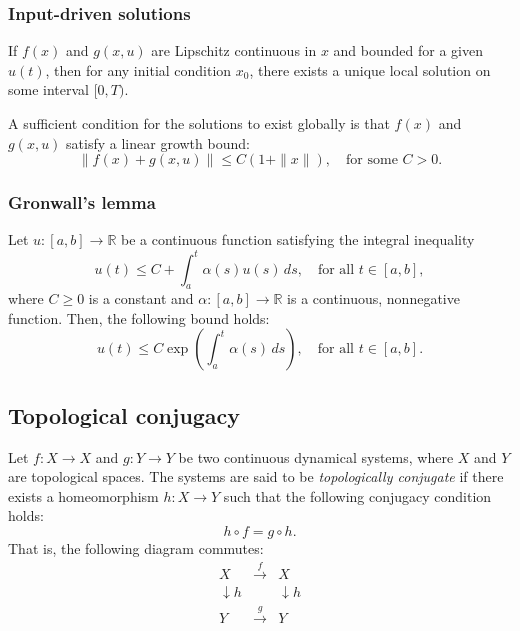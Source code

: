 \documentclass{article}
\newcounter{ct}
\begin{document}

\subsubsection{Input-driven solutions}\label{sec:inputunique}
If \( f(x) \) and \( g(x,u) \) are Lipschitz continuous in \( x \) and bounded for a given \( u(t) \), then for any initial condition \( x_0 \), there exists a unique local solution on some interval \( [0,T) \).  

A sufficient condition for the solutions to exist globally is that \( f(x) \) and \( g(x,u) \) satisfy a linear growth bound:  
\[
\| f(x) + g(x,u) \| \leq C (1 + \| x \|), \quad \text{for some } C > 0.
\]



\subsubsection{Gronwall's lemma}\label{sec:gronwall}
\begin{lemma}\label{lemma:gronwall}
Let \( u: [a,b] \to \mathbb{R} \) be a continuous function satisfying the integral inequality
\[
u(t) \leq C + \int_a^t \alpha(s) u(s) \, ds, \quad \text{for all } t \in [a,b],
\]
where \( C \geq 0 \) is a constant and \( \alpha: [a,b] \to \mathbb{R} \) is a continuous, nonnegative function. Then, the following bound holds:
\[
u(t) \leq C \exp \left( \int_a^t \alpha(s) \, ds \right), \quad \text{for all } t \in [a,b].
\]
\end{lemma}



\subsection{Topological conjugacy}\label{sec:top_conj}
\begin{definition}
Let \( f: X \to X \) and \( g: Y \to Y \) be two continuous dynamical systems, where \( X \) and \( Y \) are topological spaces.
 The systems are said to be \emph{topologically conjugate} if there exists a homeomorphism \( h: X \to Y \) such that the following conjugacy condition holds:
\[
h \circ f = g \circ h.
\]
That is, the following diagram commutes:
\[
\begin{array}{ccc}
X & \xrightarrow{f} & X \\
\downarrow h &  & \downarrow h \\
Y & \xrightarrow{g} & Y
\end{array}
\]
\end{definition}
\end{document}
